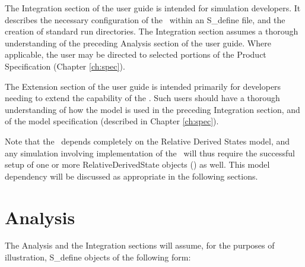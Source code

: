 The Integration section of the user guide is intended for simulation developers.
It describes the necessary configuration of the \relkinDesc\ within an
S\_define file, and the creation of standard run directories.  The Integration
section assumes a thorough understanding of the preceding Analysis section
of the user guide. Where applicable, the user may be directed to selected
portions of the Product Specification (Chapter \ref{ch:spec}).

The Extension section of the user guide is intended primarily for developers
needing to extend the capability of the \relkinDesc.  Such users should have a
thorough understanding of how the model is used in the preceding Integration
section, and of the model specification (described in Chapter \ref{ch:spec}).

Note that the \relkinDesc\ depends completely on the Relative Derived States
model, and any simulation involving implementation of the \relkinDesc\
will thus require the successful setup of one or more RelativeDerivedState
objects (\cite{dynenv:DERIVEDSTATE}) as well. This model dependency will be
discussed as appropriate in the following sections.


\section{Analysis}

The Analysis and the Integration sections will assume, for the purposes of
illustration, S\_define objects of the following form:

